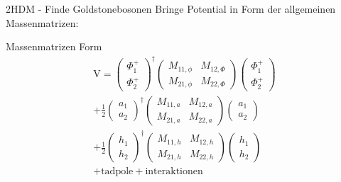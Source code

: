 \documentclass{beamer}
\begin{document}
\begin{frame}{2HDM - Finde Goldstonebosonen}
 Bringe Potential in Form der allgemeinen Massenmatrizen:
 \begin{block}{Massenmatrizen Form}
 \begin{equation}
 \begin{split}
\text{V}=\left( \begin{array}{c} \Phi^{+}_{1}\\ \Phi^{+}_{2} \end{array}\right)^{\dagger} \begin{pmatrix} M_{11,\phi} & M_{12,\Phi} \\  M_{21,\phi} & M_{22,\Phi}\end{pmatrix} \left( \begin{array}{c} \Phi^{+}_{1}\\ \Phi^{+}_{2} \end{array}\right)
\\
+\frac{1}{2}\left( \begin{array}{c} a_{1}\\ a_{2} \end{array}\right)^{\dagger} \begin{pmatrix} M_{11,a} & M_{12,a} \\  M_{21,a} & M_{22,a}\end{pmatrix} \left( \begin{array}{c}a_{1}\\ a_{2} \end{array}\right)
\\
+\frac{1}{2}\left( \begin{array}{c} h_{1}\\ h_{2} \end{array}\right)^{\dagger} \begin{pmatrix} M_{11,h} & M_{12,h} \\  M_{21,h} & M_{22,h}\end{pmatrix} \left( \begin{array}{c}h_{1}\\ h_{2} \end{array}\right) 
\\
+ \text{tadpole}+\text{interaktionen}
\end{split}
\end{equation} 

\end{block}

\end{frame}
\end{document}
